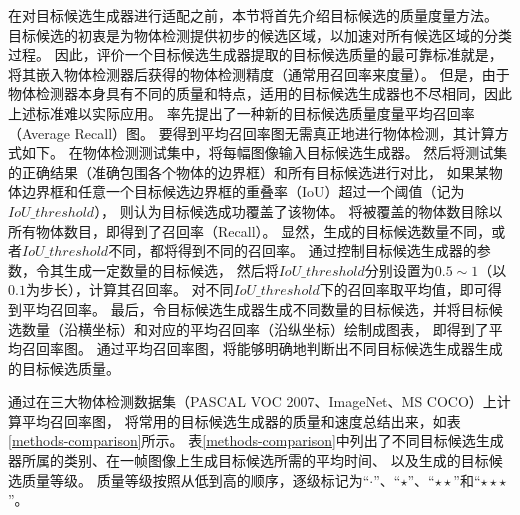 在对目标候选生成器进行适配之前，本节将首先介绍目标候选的质量度量方法。
目标候选的初衷是为物体检测提供初步的候选区域，以加速对所有候选区域的分类过程。
因此，评价一个目标候选生成器提取的目标候选质量的最可靠标准就是，将其嵌入物体检测器后获得的物体检测精度（通常用召回率来度量）。
但是，由于物体检测器本身具有不同的质量和特点，适用的目标候选生成器也不尽相同，因此上述标准难以实际应用。
\cite{dpsurvey}率先提出了一种新的目标候选质量度量\pozhehao 平均召回率（Average Recall）图。
要得到平均召回率图无需真正地进行物体检测，其计算方式如下。
在物体检测测试集中，将每幅图像输入目标候选生成器。
然后将测试集的正确结果（准确包围各个物体的边界框）和所有目标候选进行对比，
如果某物体边界框和任意一个目标候选边界框的重叠率（IoU）超过一个阈值（记为$IoU\_threshold$），
则认为目标候选成功覆盖了该物体。
将被覆盖的物体数目除以所有物体数目，即得到了召回率（Recall）。
显然，生成的目标候选数量不同，或者$IoU\_threshold$不同，都将得到不同的召回率。
通过控制目标候选生成器的参数，令其生成一定数量的目标候选，
然后将$IoU\_threshold$分别设置为$0.5\sim 1$（以$0.1$为步长），计算其召回率。
对不同$IoU\_threshold$下的召回率取平均值，即可得到平均召回率。
最后，令目标候选生成器生成不同数量的目标候选，并将目标候选数量（沿横坐标）和对应的平均召回率（沿纵坐标）绘制成图表，
即得到了平均召回率图。
通过平均召回率图，将能够明确地判断出不同目标候选生成器生成的目标候选质量。

\cite{dpsurvey}通过在三大物体检测数据集（PASCAL VOC 2007、ImageNet、MS COCO）上计算平均召回率图，
将常用的目标候选生成器的质量和速度总结出来，如表\ref{methods-comparison}所示。
表\ref{methods-comparison}中列出了不同目标候选生成器所属的类别、在一帧图像上生成目标候选所需的平均时间、
以及生成的目标候选质量等级。
质量等级按照从低到高的顺序，逐级标记为``$\cdot$''、``$\star$''、``$\star\star$''和``$\star\star\star$''。

